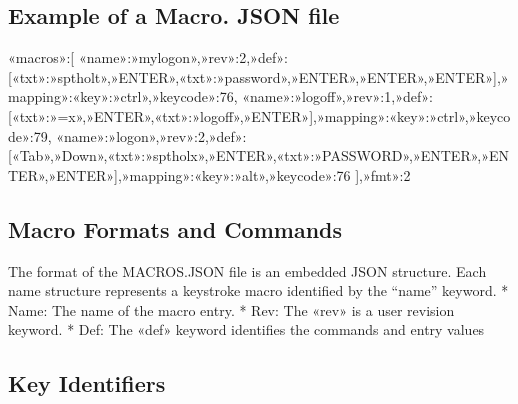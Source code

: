 \documentclass[letterpaper,10pt,english]{sphinxmanual}
\begin{document}
\subsection{Example of a Macro. JSON file}
\label{\detokenize{Customization:example-of-a-macro-json-file}}
\begin{sphinxVerbatim}[commandchars=\\\{\}]
\PYGZob{}«macros»:[
\PYGZob{}«name»:»mylogon»,»rev»:2,»def»:[\PYGZob{}«txt»:»sptholt»\PYGZcb{},»ENTER»,\PYGZob{}«txt»:»password»\PYGZcb{},»ENTER»,»ENTER»,»ENTER»],»mapping»:\PYGZob{}«key»:»ctrl»,»keycode»:76\PYGZcb{}\PYGZcb{},
\PYGZob{}«name»:»logoff»,»rev»:1,»def»:[\PYGZob{}«txt»:»=x»\PYGZcb{},»ENTER»,\PYGZob{}«txt»:»logoff»\PYGZcb{},»ENTER»],»mapping»:\PYGZob{}«key»:»ctrl»,»keycode»:79\PYGZcb{}\PYGZcb{},
\PYGZob{}«name»:»logon»,»rev»:2,»def»:[«Tab»,»Down»,\PYGZob{}«txt»:»sptholx»\PYGZcb{},»ENTER»,\PYGZob{}«txt»:»PASSWORD»\PYGZcb{},»ENTER»,»ENTER»,»ENTER»],»mapping»:\PYGZob{}«key»:»alt»,»keycode»:76\PYGZcb{}\PYGZcb{}
],»fmt»:2\PYGZcb{}
\end{sphinxVerbatim}


\subsection{Macro Formats and Commands}
\label{\detokenize{Customization:id3}}
\sphinxAtStartPar
The format of the MACROS.JSON file is an embedded JSON structure. Each name structure represents a keystroke macro identified by the “name” keyword.
* Name: The name of the macro entry.
* Rev: The «rev» is a user revision keyword.
* Def: The «def» keyword identifies the commands and entry values


\subsection{Key Identifiers}
\label{\detokenize{Customization:key-identifiers}}
\begin{sphinxVerbatim}[commandchars=\\\{\}]
                                                               
                                               
 
\end{sphinxVerbatim}
\end{document}
